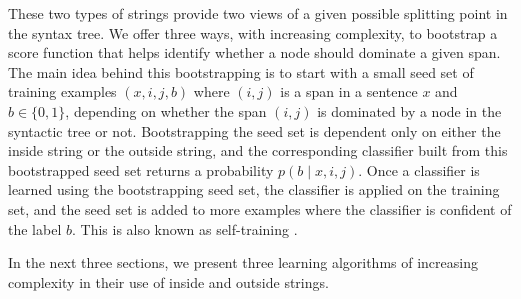 \documentclass[11pt]{article}
\newcommand{\ignore}[1]{}
\begin{document}
These two types of strings provide two views of a given possible splitting point in the syntax tree. We offer three ways, with increasing complexity, to bootstrap a score function that helps identify whether a node should dominate a given span.
The main idea behind this bootstrapping is to start with a small seed set of training examples $(x, i,j, b)$ where $(i,j)$ is a span in a sentence $x$ and $b \in \{ 0, 1 \}$, depending on whether the span $(i,j)$ is dominated by a node in the syntactic tree or not.
Bootstrapping the seed set is dependent only on either the inside string or the outside string, and the corresponding classifier built from this bootstrapped seed set returns a probability $p(b \mid x, i, j)$. Once a classifier is learned using the bootstrapping seed set, the classifier is applied on the training set, and the seed set is added to more examples where the classifier is confident of the label $b$. This is also known as self-training \citep{mcclosky-etal-2006-effective, mcclosky-etal-2008-self}.

\ignore{
\begin{figure}[t]
\begin{footnotesize}
\framebox{\parbox{\columnwidth}{

{\bf Inputs:} Input strings $x^{(1)},\ldots,x^{(N)}$, an inside seed function $\mathrm{iseed}(x,i,j) \in \{ 0, 1, \bot \}$ and an outside seed function $\mathrm{oseed}(x,i,j) \in \{ 0, 1, \bot \}$.


{\bf Algorithm:} (calculate all inside and outside strings)

\begin{itemize}

\item For all $i \in [N]$ such that $a_i \in $,

\end{itemize}

{\bf Return:}
${f^1} c^1_{a_1}$
}}
\end{footnotesize}
\caption{\small The tensor form for calculation of $p(r_1 \ldots
  r_N)$.}
\label{fig:dpobservable}
\vspace{-2ex}
\end{figure}
}

In the next three sections, we present three learning algorithms of increasing complexity in their use of inside and outside strings.
\end{document}

